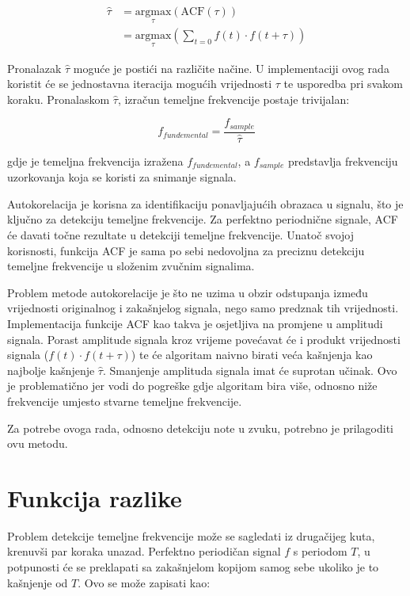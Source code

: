 \documentclass[times, utf8, diplomski, numeric]{fer}
\begin{document}
\begin{equation}
	\begin{split}
		\hat{\tau} &= \underset{\tau}{\mathrm{argmax}} (\mathrm{ACF}(\tau)) \\
		&= \underset{\tau}{\mathrm{argmax}} (\sum_{t = 0}^{} {f(t) \cdot f(t + \tau)})
	\end{split}
\end{equation}

Pronalazak $\hat{\tau}$ moguće je postići na različite načine. U implementaciji ovog rada koristit će se jednostavna iteracija mogućih vrijednosti $\tau$ te usporedba pri svakom koraku. Pronalaskom $\hat{\tau}$, izračun temeljne frekvencije postaje trivijalan:

\begin{equation}
	f_{fundemental} = \frac{f_{sample}}{\hat{\tau}}
\end{equation}

gdje je temeljna frekvencija izražena $f_{fundemental}$, a $f_{sample}$ predstavlja frekvenciju uzorkovanja koja se koristi za snimanje signala.

Autokorelacija je korisna za identifikaciju ponavljajućih obrazaca u signalu, što je ključno za detekciju temeljne frekvencije. Za perfektno periodnične signale, ACF će davati točne rezultate u detekciji temeljne frekvencije. Unatoč svojoj korisnosti, funkcija ACF je sama po sebi nedovoljna za preciznu detekciju temeljne frekvencije u složenim zvučnim signalima.

Problem metode autokorelacije je što ne uzima u obzir odstupanja između vrijednosti originalnog i zakašnjelog signala, nego samo predznak tih vrijednosti. Implementacija funkcije ACF kao takva je osjetljiva na promjene u amplitudi signala. Porast amplitude signala kroz vrijeme povećavat će i produkt vrijednosti signala ($f(t) \cdot f(t + \tau)$) te će algoritam naivno birati veća kašnjenja kao najbolje kašnjenje $\hat{\tau}$. Smanjenje amplituda signala imat će suprotan učinak. Ovo je problematično jer vodi do pogreške gdje algoritam bira više, odnosno niže frekvencije umjesto stvarne temeljne frekvencije.

Za potrebe ovoga rada, odnosno detekciju note u zvuku, potrebno je prilagoditi ovu metodu.

\section{Funkcija razlike}
%
Problem detekcije temeljne frekvencije može se sagledati iz drugačijeg kuta, krenuvši par koraka unazad. Perfektno periodičan signal $f$ s periodom $T$, u potpunosti će se preklapati sa zakašnjelom kopijom samog sebe ukoliko je to kašnjenje od $T$. Ovo se može zapisati kao:
\end{document}
